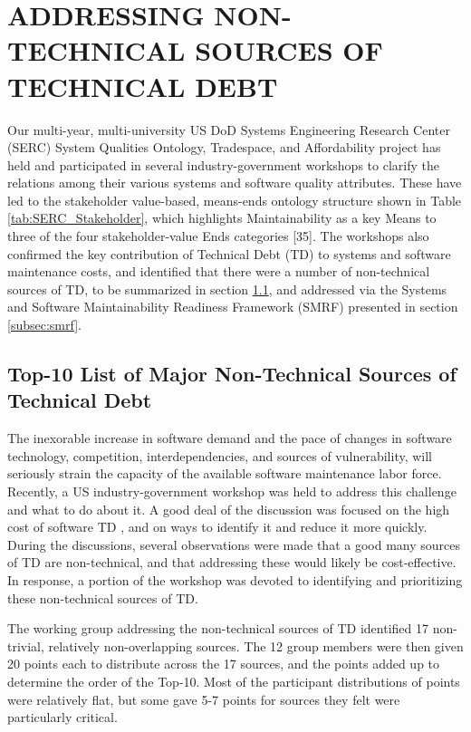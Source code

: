 \section{ADDRESSING NON-TECHNICAL SOURCES OF TECHNICAL DEBT}
\label{sec:smrf}

Our multi-year, multi-university US DoD Systems Engineering Research Center (SERC) System Qualities Ontology, Tradespace, and Affordability project has held and participated in several industry-government workshops to clarify the relations among their various systems and software quality attributes.  These have led to the stakeholder value-based, means-ends ontology structure shown in Table \ref{tab:SERC_Stakeholder}, which highlights Maintainability as a key Means to three of the four stakeholder-value Ends categories [35].
The workshops also confirmed the key contribution of Technical Debt (TD) to systems and software maintenance costs, and identified that there were a number of non-technical sources of TD, to be summarized in section \ref{subsec:topten}, and addressed via the Systems and Software Maintainability Readiness Framework (SMRF) presented in section \ref{subsec:smrf}.


\subsection{Top-10 List of Major Non-Technical Sources of Technical Debt}
\label{subsec:topten}

The inexorable increase in software demand and the pace of changes in software technology, competition, interdependencies, and sources of vulnerability, will seriously strain the capacity of the available software maintenance labor force.
Recently, a US industry-government workshop was held to address this challenge and what to do about it.
A good deal of the discussion was focused on the high cost of software TD \citep{6336722}, and on ways to identify it and reduce it more quickly.
During the discussions, several observations were made that a good many sources of TD are non-technical, and that addressing these would likely be cost-effective.
In response, a portion of the workshop was devoted to identifying and prioritizing these non-technical sources of TD.

The working group addressing the non-technical sources of TD identified 17 non-trivial, relatively non-overlapping sources.
The 12 group members were then given 20 points each to distribute across the 17 sources, and the points added up to determine the order of the Top-10.
Most of the participant distributions of points were relatively flat, but some gave 5-7 points for sources they felt were particularly critical.

